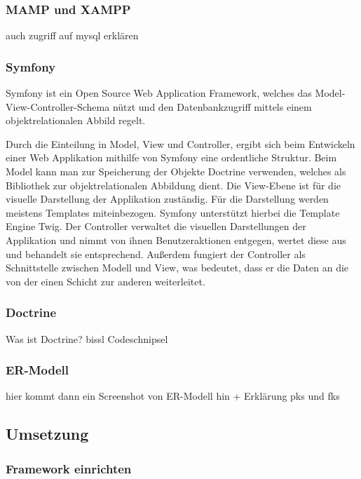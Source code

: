     \subsubsection{MAMP und XAMPP}

auch zugriff auf mysql erklären

    \subsubsection{Symfony}

Symfony ist ein Open Source Web Application Framework, welches das Model-View-Controller-Schema nützt und den Datenbankzugriff mittels einem objektrelationalen Abbild regelt.

Durch die Einteilung in Model, View und Controller, ergibt sich beim Entwickeln einer Web Applikation mithilfe von Symfony eine ordentliche Struktur.
Beim Model kann man zur Speicherung der Objekte Doctrine verwenden, welches als Bibliothek zur objektrelationalen Abbildung dient.
Die View-Ebene ist für die visuelle Darstellung der Applikation zuständig. Für die  Darstellung werden meistens Templates miteinbezogen. Symfony unterstützt hierbei die Template Engine Twig.
Der Controller verwaltet die visuellen Darstellungen der Applikation und nimmt von ihnen Benutzeraktionen entgegen, wertet diese aus und behandelt sie entsprechend. Außerdem fungiert der Controller als Schnittstelle zwischen Modell und View, was bedeutet, dass er die Daten an die von der einen Schicht zur anderen weiterleitet.


    \subsubsection{Doctrine}

Was ist Doctrine?
bissl Codeschnipsel

    \subsubsection{ER-Modell}

hier kommt dann ein Screenshot von ER-Modell hin + Erklärung pks und fks

  \subsection{Umsetzung}

    \subsubsection{Framework einrichten}


